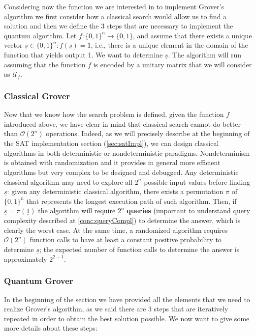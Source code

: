 \documentclass[english]{article}
\begin{document}
			Considering now the function we are interested in to implement Grover's algorithm we first consider how a classical search would allow us to find a solution and then we define the 3 steps that are necessary to implement the quantum algorithm. Let $f:\{0,1\}^n \rightarrow \{0,1\}$, and assume that there exists a unique vector $\underline{s}\in\{0,1\}^n : f(\underline{s}) = 1$, i.e., there is a unique element in the domain of the function that yields output 1. We want to determine $\underline{s}$. The algorithm will run assuming that the function $f$ is encoded by a unitary matrix that we will consider as $\mathcal{U}_f$.
			
			\subsubsection{Classical Grover}
			\label{sec:groverClass}
				Now that we know how the search problem is defined, given the function $f$ introduced above, we have clear in mind that classical search cannot do better than $\mathcal{O}(2^n)$ operations. Indeed, as we will precisely describe at the beginning of the SAT implementation section (\ref{sec:satImpl}), we can design classical algorithms in both deterministic or nondeterministic paradigms. Nondeterminism is obtained with randomization and it provides in general more efficient algorithms but very complex to be designed and debugged. Any deterministic classical algorithm may need to explore all $2^n$ possible input values before finding $\underline{s}$: given any deterministic classical algorithm, there exists a permutation $\pi$ of $\{0,1\}^n$ that represents the longest execution path of such algorithm. Then, if $\underline{s} = \pi(\underline{1})$ the algorithm will require $2^n$ \textbf{queries} (important to understand query complexity described at \ref{conc:queryCompl}) to determine the answer, which is clearly the worst case. At the same time, a randomized algorithm requires $\mathcal{O}(2^n)$ function calls to have at least a constant positive probability to determine $\underline{s}$; the expected number of function calls to determine the answer is approximately $2^{2-1}$.
			
			\subsubsection{Quantum Grover}
			\label{sec:groverQuant}
				In the beginning of the section we have provided all the elements that we need to realize Grover's algorithm, as we said there are 3 steps that are iteratively repeated in order to obtain the best solution possible. We now want to give some more details about these steps:
				
\end{document}
